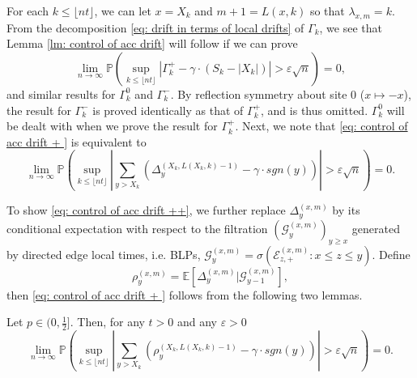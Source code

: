 \documentclass[EJP]{ejpecp} %
\newcommand{\abs}[1]{\left\vert #1 \right\vert}
\begin{document}
For each $k\leq \lfloor nt\rfloor$, we can let $x = X_k$ and $ m +1=L(x,k)$ so that $\lambda_{x,m} = k$. From the decomposition \eqref{eq: drift in terms of local drifts} of $\Gamma_k$, we see that
Lemma \ref{lm: control of acc drift} will follow if we can prove
\begin{equation}\label{eq: control of acc drift + }
	\lim_{n \to \infty }\mathbb{P}\left(\sup_{k\leq\lfloor nt \rfloor} \abs{\Gamma^+_k - \gamma \cdot \left(S_k - \abs{X_k} \right)   } > \varepsilon \sqrt{n}  \right) =0, 
\end{equation}
and similar results for $\Gamma_k^0$ and $\Gamma_k^-$.
By reflection symmetry about site $0$ ($x \mapsto -x$), the result for $\Gamma_k^-$ is proved identically as that of $\Gamma_k^+$, and is thus omitted. 
$\Gamma_k^0$ will be dealt with when we prove the result for $\Gamma_k^+$.
Next, we note that \eqref{eq: control of acc drift + } is equivalent to
\begin{equation}\label{eq: control of acc drift ++}
	\lim_{n \to \infty }\mathbb{P}\left(\sup_{k\leq\lfloor nt \rfloor} \abs{\sum_{y> X_k} \left( \Delta_{y}^{(X_k,L(X_k,k) - 1)} - \gamma  \cdot sgn(y) \right)   }  > \varepsilon \sqrt{n}  \right) =0. 
\end{equation}

To show \eqref{eq: control of acc drift ++}, we further replace $\Delta_{y}^{(x,m)}$ by its conditional expectation with respect to the filtration $\left(\mathcal{G}_{y}^{(x,m)}\right)_{y\geq x}$ generated by directed edge local times, i.e. BLPs, $ \mathcal{G}_{y}^{(x,m)} = \sigma\left( \mathcal{E}^{(x,m)}_{z,+} : x \le z \leq y \right)$.
Define
\begin{equation}\label{eq: conditional mean}
	\rho_{y}^{(x,m)}= \mathbb{E}\left[\Delta_y^{(x,m)} | \mathcal{G}_{y-1}^{(x,m)}\right],
\end{equation}
then \eqref{eq: control of acc drift + } follows from the following two lemmas.
\begin{lemma}\label{lm: approximation of means of local drift}
	Let $p\in (0,\frac{1}{2}]$. Then, for any $t>0$ and any $\varepsilon >0$
	\begin{equation}
		\lim_{n \to \infty }\mathbb{P}\left(\sup_{k\leq\lfloor nt \rfloor} \abs{\sum_{y> X_k} \left( \rho_{y}^{(X_k,L(X_k,k)-1)} - \gamma  \cdot sgn(y) \right)   }  > \varepsilon \sqrt{n}  \right) =0. 
	\end{equation}
\end{lemma}
\end{document}
